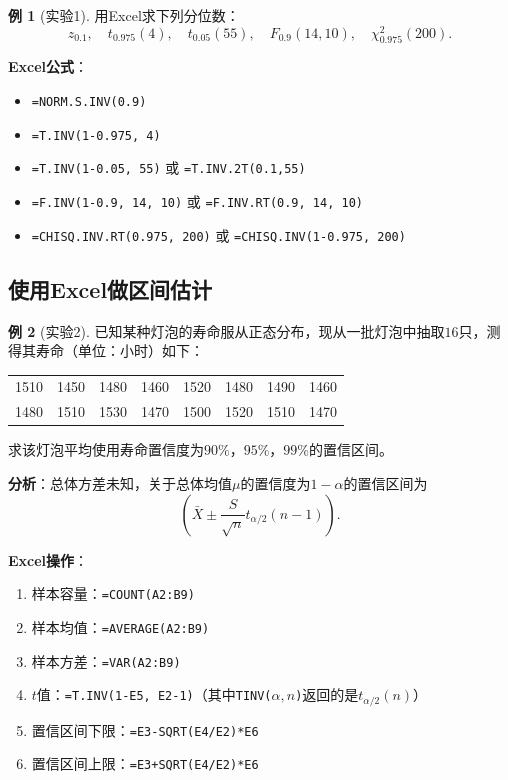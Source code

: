 \documentclass[11pt,a4paper]{report}
\theoremstyle{definition}
\newtheorem{example}{例}[chapter]
\theoremstyle{plain}
\begin{document}
\begin{example}[实验1]
用Excel求下列分位数：
\[
z_{0.1},\quad t_{0.975}(4),\quad t_{0.05}(55),\quad F_{0.9}(14,10),\quad \chi_{0.975}^2(200).
\]

\textbf{Excel公式}：
\begin{itemize}[leftmargin=2em]
    \item \texttt{=NORM.S.INV(0.9)}
    \item \texttt{=T.INV(1-0.975, 4)}
    \item \texttt{=T.INV(1-0.05, 55)} 或 \texttt{=T.INV.2T(0.1,55)}
    \item \texttt{=F.INV(1-0.9, 14, 10)} 或 \texttt{=F.INV.RT(0.9, 14, 10)}
    \item \texttt{=CHISQ.INV.RT(0.975, 200)} 或 \texttt{=CHISQ.INV(1-0.975, 200)}
\end{itemize}
\end{example}

\subsection{使用Excel做区间估计}

\begin{example}[实验2]
已知某种灯泡的寿命服从正态分布，现从一批灯泡中抽取$16$只，测得其寿命（单位：小时）如下：
\begin{center}
\begin{tabular}{cccccccc}
1510 & 1450 & 1480 & 1460 & 1520 & 1480 & 1490 & 1460\\
1480 & 1510 & 1530 & 1470 & 1500 & 1520 & 1510 & 1470
\end{tabular}
\end{center}
求该灯泡平均使用寿命置信度为$90\%$，$95\%$，$99\%$的置信区间。

\textbf{分析}：总体方差未知，关于总体均值$\mu$的置信度为$1-\alpha$的置信区间为
\[
\left(\bar{X}\pm\frac{S}{\sqrt{n}}t_{\alpha/2}(n-1)\right).
\]

\textbf{Excel操作}：
\begin{enumerate}[label=\arabic*.,leftmargin=2em]
    \item 样本容量：\texttt{=COUNT(A2:B9)}
    \item 样本均值：\texttt{=AVERAGE(A2:B9)}
    \item 样本方差：\texttt{=VAR(A2:B9)}
    \item $t$值：\texttt{=T.INV(1-E5, E2-1)}（其中\texttt{TINV($\alpha,n$)}返回的是$t_{\alpha/2}(n)$）
    \item 置信区间下限：\texttt{=E3-SQRT(E4/E2)*E6}
    \item 置信区间上限：\texttt{=E3+SQRT(E4/E2)*E6}
\end{enumerate}
\end{example}
\end{document}
